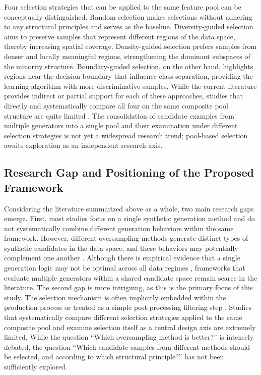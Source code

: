 \documentclass[pdflatex]{sn-jnl}
\begin{document}
Four selection strategies that can be applied to the same feature pool can be conceptually distinguished. Random selection makes selections without adhering to any structural principles and serves as the baseline. Diversity-guided selection aims to preserve samples that represent different regions of the data space, thereby increasing spatial coverage. Density-guided selection prefers samples from denser and locally meaningful regions, strengthening the dominant subspaces of the minority structure. Boundary-guided selection, on the other hand, highlights regions near the decision boundary that influence class separation, providing the learning algorithm with more discriminative samples. While the current literature provides indirect or partial support for each of these approaches, studies that directly and systematically compare all four on the same composite pool structure are quite limited \cite{ref05}. The consolidation of candidate examples from multiple generators into a single pool and their examination under different selection strategies is not yet a widespread research trend; pool-based selection awaits exploration as an independent research axis.

\subsection{Research Gap and Positioning of the Proposed Framework}

Considering the literature summarized above as a whole, two main research gaps emerge. First, most studies focus on a single synthetic generation method and do not systematically combine different generation behaviors within the same framework. However, different oversampling methods generate distinct types of synthetic candidates in the data space, and these behaviors may potentially complement one another \cite{ref15} \cite{ref41} \cite{ref42}. Although there is empirical evidence that a single generation logic may not be optimal across all data regimes \cite{ref06} \cite{ref15}, frameworks that evaluate multiple generators within a shared candidate space remain scarce in the literature. The second gap is more intriguing, as this is the primary focus of this study. The selection mechanism is often implicitly embedded within the production process or treated as a simple post-processing filtering step \cite{ref35} \cite{ref36}. Studies that systematically compare different selection strategies applied to the same composite pool and examine selection itself as a central design axis are extremely limited. While the question ``Which oversampling method is better?'' is intensely debated, the question ``Which candidate samples from different methods should be selected, and according to which structural principle?'' has not been sufficiently explored.
\end{document}
